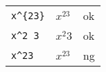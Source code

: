 \documentclass[preview]{standalone}
\newcommand{\tA}[1]{\textcolor{cA}{#1}}
\newcommand{\tD}[1]{\textcolor{cD}{#1}}
\begin{document}
\begin{table}[h]
    \centering
    \begin{tabular}{lll}
        \verb|x^{23}| & $x^{23}$ & \tA{ok} \\
        \verb|x^2 3|  & $x^2 3$  & \tA{ok} \\
        \verb|x^23|   & $x^23$   & \tD{ng} \\
    \end{tabular}
\end{table}
\end{document}
